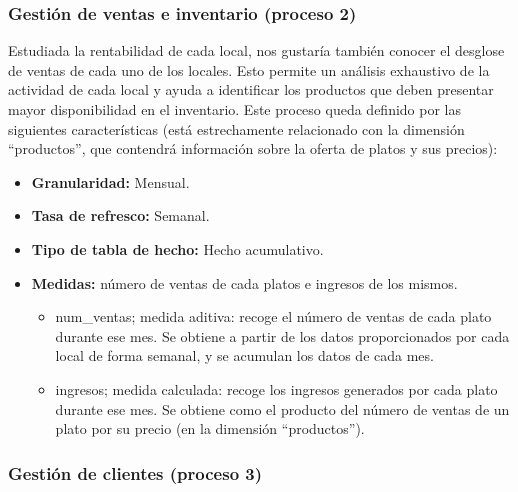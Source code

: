 \documentclass[12pt]{opticajnl}
\begin{document}
\subsubsection{Gestión de ventas e inventario (proceso 2)}

Estudiada la rentabilidad de cada local, nos gustaría también conocer el desglose de ventas de cada uno de los locales. Esto permite un análisis exhaustivo de la actividad de cada local y ayuda a identificar los productos que deben presentar mayor disponibilidad en el inventario. Este proceso queda definido por las siguientes características (está estrechamente relacionado con la dimensión ``productos'', que contendrá información sobre la oferta de platos y sus precios):
\begin{itemize}
\item \textbf{Granularidad:} Mensual.
\item \textbf{Tasa de refresco:} Semanal.
\item \textbf{Tipo de tabla de hecho:} Hecho acumulativo.
\item \textbf{Medidas:} número de ventas de cada platos e ingresos de los mismos.
\begin{itemize}
\item num\_ventas; medida aditiva: recoge el número de ventas de cada plato durante ese mes. Se obtiene a partir de los datos proporcionados por cada local de forma semanal, y se acumulan los datos de cada mes.
\item ingresos; medida calculada: recoge los ingresos generados por cada plato durante ese mes. Se obtiene como el producto del número de ventas de un plato por su precio (en la dimensión ``productos'').
\end{itemize}
\end{itemize}

\subsubsection{Gestión de clientes (proceso 3)}
\end{document}
